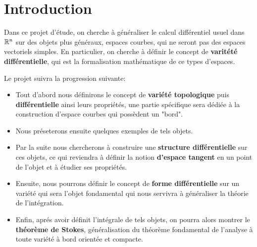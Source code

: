 \chapter{Introduction}
   Dans ce projet d'étude, on cherche à généraliser le calcul différentiel usuel dans \( \mathbb{R}^n \) sur des objets plus généraux, espaces courbes, qui ne seront pas des espaces vectoriels simples. En particulier, on cherche à définir le concept de \textbf{varitété différentielle}, qui est la formalisation mathématique de ce types d'espaces.\< 
   
   Le projet suivra la progression suivante:
   \begin{itemize}
      \item Tout d'abord nous définirons le concept de \textbf{variété topologique} puis \textbf{différentielle} ainsi leurs propriétés, une partie spécifique sera dédiée à la construction d'espace courbes qui possèdent un "bord".
      \item Nous préseterons ensuite quelques exemples de tels objets.
      \item Par la suite nous chercherons à construire une \textbf{structure différentielle} sur ces objets, ce qui reviendra à définir la notion \textbf{d'espace tangent} en un point de l'objet et à étudier ses propriétés.
      \item Ensuite, nous pourrons définir le concept de \textbf{forme différentielle} sur un variété qui sera l'objet fondamental qui nous servivra à généraliser la théorie de l'intégration.
      \item Enfin, aprés avoir définit l'intégrale de tels objets, on pourra alors montrer le \textbf{théorème de Stokes}, généralisation du théorème fondamental de l'analyse à toute variété à bord orientée et compacte.
   \end{itemize}